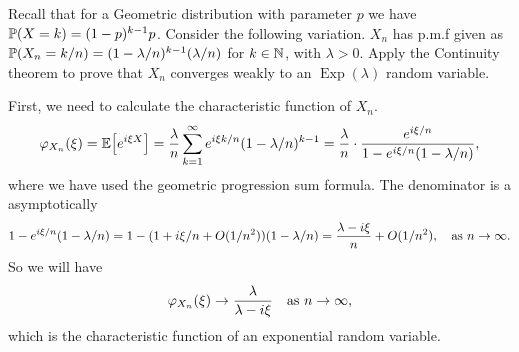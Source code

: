 \begin{problem}
	Recall that for a Geometric distribution with parameter $ p $ we have $ \prob(X = k) = (1-p)^{k-1}p $. Consider the following variation. $ X_n $ has p.m.f given as $ \prob(X_n = k/n) = (1-\lambda/n)^{k-1}(\lambda/n) $ for $ k\in \N $, with $ \lambda >0 $. Apply the Continuity theorem  to prove that $ X_n $ converges weakly to an $ \operatorname{Exp}(\lambda) $ random variable. 
\end{problem}
\begin{solution}
	First, we need to calculate the characteristic function of $ X_n $. 
	\[ \phi_{X_n}(\xi) = \E{e^{i\xi X}} = \frac{\lambda}{n}\sum_{k=1}^{\infty}e^{i\xi k /n} (1-\lambda/n)^{k-1} = \frac{\lambda}{n}\cdot \frac{e^{i\xi /n}}{1 - e^{i\xi /n}(1-\lambda/n)}, \]
	where we have used the geometric progression sum formula. The denominator is a asymptotically
	\[ 1 - e^{i\xi /n}(1-\lambda/n) = 1 - (1+i\xi/n + O(1/n^2))(1-\lambda/n) = \frac{\lambda - i\xi}{n} + O(1/n^2), \quad \text{as $ n\to\infty $}. \]  
	So we will have
	\[ \phi_{X_n} (\xi) \to \frac{\lambda}{\lambda - i \xi} \quad \text{as $ n\to\infty $}, \]
	which is the characteristic function of an exponential random variable.
\end{solution}





